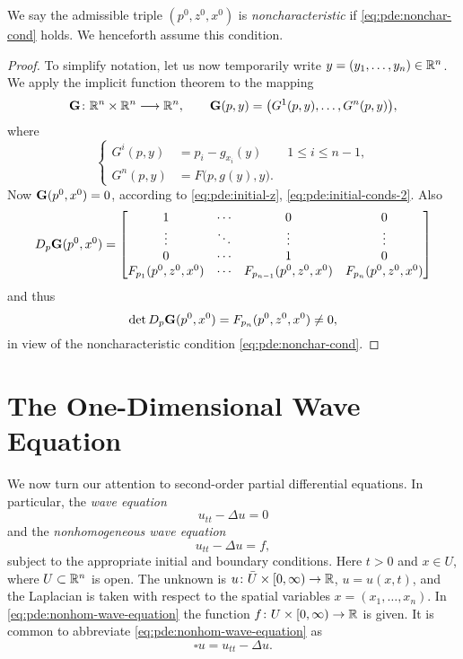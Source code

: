 We say the admissible triple \((p^0,z^0,x^0)\) is \emph{noncharacteristic}
if \eqref{eq:pde:nonchar-cond} holds. We henceforth assume this condition.
\begin{proof}
  To simplify notation, let us now temporarily write
  \(y=(y_1,\dotsc,y_n)\in\mathbb{R}^n\). We apply the implicit function theorem
  to the mapping
  \[
    \mathbf{G}\colon\mathbb{R}^n\times\mathbb{R}^n\longrightarrow\mathbb{R}^n,\qquad
    \mathbf{G}(p,y)=\bigl(G^1(p,y),\dotsc,G^n(p,y)\bigr),
  \]
  where
  \[
    \left\{
      \begin{aligned}
        G^i(p,y)&=p_i-g_{x_i}(y)\qquad 1\leq i\leq n-1,\\
        G^n(p,y)&=F\bigl(p,g(y),y\bigr).
      \end{aligned}
    \right.
  \]
  Now \(\mathbf{G}(p^0,x^0)=0\), according to \eqref{eq:pde:initial-z},
  \eqref{eq:pde:initial-conds-2}. Also
  \[
    D_p\mathbf{G}(p^0,x^0)
    =
    \begin{bmatrix}
      1&\cdots&0&0\\
      \vdots&\ddots&\vdots&\vdots\\
      0&\cdots&1&0\\
      F_{p_1}(p^0,z^0,x^0)&\cdots&F_{p_{n-1}}(p^0,z^0,x^0)&F_{p_n}(p^0,z^0,x^0)
    \end{bmatrix}
  \]
  and thus
  \[
    \det D_p\mathbf{G}(p^0,x^0)=F_{p_n}(p^0,z^0,x^0)\neq 0,
  \]
  in view of the noncharacteristic condition \eqref{eq:pde:nonchar-cond}.
\end{proof}

\section{The One-Dimensional Wave Equation}
We now turn our attention to second-order partial differential
equations. In particular, the \emph{wave equation}
\begin{equation}
  \label{eq:pde:wave-equation}
  u_{tt}-\Delta u=0
\end{equation}
and the \emph{nonhomogeneous wave equation}
\begin{equation}
  \label{eq:pde:nonhom-wave-equation}
  u_{tt}-\Delta u=f,
\end{equation}
subject to the appropriate initial and boundary conditions. Here \(t>0\)
and \(x\in U\), where \(U\subset\mathbb{R}^n\) is open. The unknown is
\(u\colon \bar U\times[0,\infty)\to\mathbb{R}\), \(u=u(x,t)\), and the Laplacian
is taken with respect to the spatial variables \(x=(x_1,\dotsc,x_n)\). In
\eqref{eq:pde:nonhom-wave-equation} the function
\(f\colon U\times[0,\infty)\to\mathbb{R}\) is given. It is common to abbreviate
\eqref{eq:pde:nonhom-wave-equation} as
\[
  \square u=u_{tt}-\Delta u.
\]

